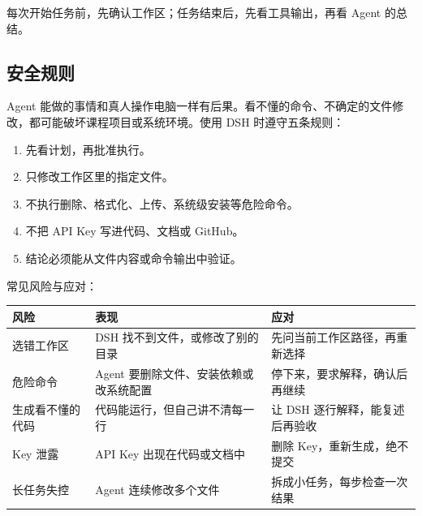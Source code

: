 每次开始任务前，先确认工作区；任务结束后，先看工具输出，再看 Agent
的总结。

\subsection{安全规则}\label{ux5b89ux5168ux89c4ux5219}

Agent
能做的事情和真人操作电脑一样有后果。看不懂的命令、不确定的文件修改，都可能破坏课程项目或系统环境。使用
DSH 时遵守五条规则：

\begin{enumerate}
\def\labelenumi{\arabic{enumi}.}
\tightlist
\item
  先看计划，再批准执行。
\item
  只修改工作区里的指定文件。
\item
  不执行删除、格式化、上传、系统级安装等危险命令。
\item
  不把 API Key 写进代码、文档或 GitHub。
\item
  结论必须能从文件内容或命令输出中验证。
\end{enumerate}

常见风险与应对：

\begin{longtable}[]{@{}
  >{\raggedright\arraybackslash}p{}
  >{\raggedright\arraybackslash}p{}
  >{\raggedright\arraybackslash}p{}@{}}
\toprule\noalign{}
\begin{minipage}[b]{\linewidth}\raggedright
风险
\end{minipage} & \begin{minipage}[b]{\linewidth}\raggedright
表现
\end{minipage} & \begin{minipage}[b]{\linewidth}\raggedright
应对
\end{minipage} \\
\midrule\noalign{}
\endhead
\bottomrule\noalign{}
\endlastfoot
选错工作区 & DSH 找不到文件，或修改了别的目录 &
先问当前工作区路径，再重新选择 \\
危险命令 & Agent 要删除文件、安装依赖或改系统配置 &
停下来，要求解释，确认后再继续 \\
生成看不懂的代码 & 代码能运行，但自己讲不清每一行 & 让 DSH
逐行解释，能复述后再验收 \\
Key 泄露 & API Key 出现在代码或文档中 & 删除 Key，重新生成，绝不提交 \\
长任务失控 & Agent 连续修改多个文件 & 拆成小任务，每步检查一次结果 \\
\end{longtable}

